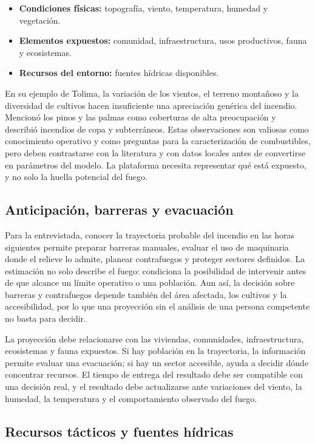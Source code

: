 \begin{itemize}
  \item \textbf{Condiciones físicas:} topografía, viento, temperatura, humedad y vegetación.
  \item \textbf{Elementos expuestos:} comunidad, infraestructura, usos productivos, fauna y ecosistemas.
  \item \textbf{Recursos del entorno:} fuentes hídricas disponibles.
\end{itemize}

En su ejemplo de Tolima, la variación de los vientos, el terreno montañoso y la diversidad de cultivos hacen insuficiente una apreciación genérica del incendio. Mencionó los pinos y las palmas como coberturas de alta preocupación y describió incendios de copa y subterráneos. Estas observaciones son valiosas como conocimiento operativo y como preguntas para la caracterización de combustibles, pero deben contrastarse con la literatura y con datos locales antes de convertirse en parámetros del modelo. La plataforma necesita representar qué está expuesto, y no solo la huella potencial del fuego.

\subsection{Anticipación, barreras y evacuación}

Para la entrevistada, conocer la trayectoria probable del incendio en las horas siguientes permite preparar barreras manuales, evaluar el uso de maquinaria donde el relieve lo admite, planear contrafuegos y proteger sectores definidos. La estimación no solo describe el fuego: condiciona la posibilidad de intervenir antes de que alcance un límite operativo o una población. Aun así, la decisión sobre barreras y contrafuegos depende también del área afectada, los cultivos y la accesibilidad, por lo que una proyección sin el análisis de una persona competente no basta para decidir.

La proyección debe relacionarse con las viviendas, comunidades, infraestructura, ecosistemas y fauna expuestos. Si hay población en la trayectoria, la información permite evaluar una evacuación; si hay un sector accesible, ayuda a decidir dónde concentrar recursos. El tiempo de entrega del resultado debe ser compatible con una decisión real, y el resultado debe actualizarse ante variaciones del viento, la humedad, la temperatura y el comportamiento observado del fuego.

\subsection{Recursos tácticos y fuentes hídricas}

